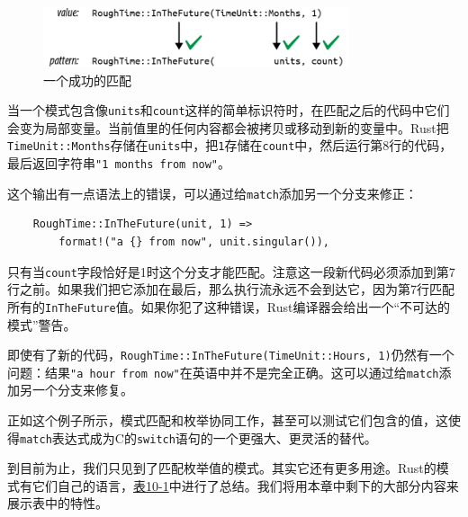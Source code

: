 \begin{figure}[htbp]
    \centering
    \includegraphics[width=0.8\textwidth]{../img/f10-5.png}
    \caption{一个成功的匹配}
    \label{f10-5}
\end{figure}

当一个模式包含像\texttt{units}和\texttt{count}这样的简单标识符时，在匹配之后的代码中它们会变为局部变量。当前值里的任何内容都会被拷贝或移动到新的变量中。Rust把\texttt{TimeUnit::Months}存储在\texttt{units}中，把\texttt{1}存储在\texttt{count}中，然后运行第8行的代码，最后返回字符串\texttt{"1 months from now"}。

这个输出有一点语法上的错误，可以通过给\texttt{match}添加另一个分支来修正：
\begin{verbatim}
    RoughTime::InTheFuture(unit, 1) =>
        format!("a {} from now", unit.singular()),
\end{verbatim}

只有当\texttt{count}字段恰好是1时这个分支才能匹配。注意这一段新代码必须添加到第7行之前。如果我们把它添加在最后，那么执行流永远不会到达它，因为第7行匹配所有的\texttt{InTheFuture}值。如果你犯了这种错误，Rust编译器会给出一个“不可达的模式”警告。

即使有了新的代码，\texttt{RoughTime::InTheFuture(TimeUnit::Hours, 1)}仍然有一个问题：结果\texttt{"a hour from now"}在英语中并不是完全正确。这可以通过给\texttt{match}添加另一个分支来修复。

正如这个例子所示，模式匹配和枚举协同工作，甚至可以测试它们包含的值，这使得\texttt{match}表达式成为C的\texttt{switch}语句的一个更强大、更灵活的替代。

到目前为止，我们只见到了匹配枚举值的模式。其实它还有更多用途。Rust的模式有它们自己的语言，\hyperref[t10-1]{表10-1}中进行了总结。我们将用本章中剩下的大部分内容来展示表中的特性。

